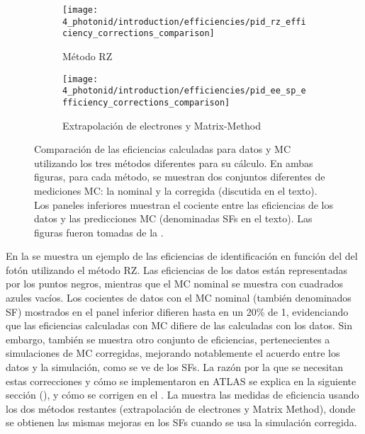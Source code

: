 \begin{figure}[ht!]
    \centering
    \begin{subfigure}[h]{0.49\linewidth}
        \centering
        \texttt{[image: 4\_photonid/introduction/efficiencies/pid\_rz\_efficiency\_corrections\_comparison]}
        \caption{Método \acf{RZ}}
        \label{fig:pid_ss:pid:efficiencies:efficiencies_old:rz}
    \end{subfigure}
    \hfill
    \begin{subfigure}[h]{0.49\linewidth}
        \centering
        \texttt{[image: 4\_photonid/introduction/efficiencies/pid\_ee\_sp\_efficiency\_corrections\_comparison]}
        \caption{Extrapolación de electrones y Matrix-Method}
        \label{fig:pid_ss:pid:efficiencies:efficiencies_old:ee_sp}
    \end{subfigure}
    \caption{Comparación de las eficiencias calculadas para datos y \ac{MC} utilizando los tres métodos diferentes para su cálculo. En ambas figuras, para cada método, se muestran dos conjuntos diferentes de mediciones \ac{MC}: la nominal y la corregida (discutida en el texto). Los paneles inferiores muestran el cociente entre las eficiencias de los datos y las predicciones \ac{MC} (denominadas \acfp{SF} en el texto). Las figuras fueron tomadas de la .}
    \label{fig:pid_ss:pid:efficiencies:efficiencies_old}
\end{figure}


En la \Fig{\ref{fig:pid_ss:pid:efficiencies:efficiencies_old:rz}} se muestra un ejemplo de las eficiencias de identificación en función del \pt del fotón utilizando el método \ac{RZ}. Las eficiencias de los datos están representadas por los puntos negros, mientras que el \ac{MC} nominal se muestra con cuadrados azules vacíos. Los cocientes de datos con el \ac{MC} nominal (también denominados \acf{SF}) mostrados en el panel inferior difieren hasta en un 20\% de 1, evidenciando que las eficiencias calculadas con \ac{MC} difiere de las calculadas con los datos. Sin embargo, también se muestra otro conjunto de eficiencias, pertenecientes a simulaciones de \ac{MC} corregidas, mejorando notablemente el acuerdo entre los datos y la simulación, como se ve de los \acp{SF}. La razón por la que se necesitan estas correcciones y cómo se implementaron en \ac{ATLAS} se explica en la siguiente sección (\Sect{\ref{sec:pid_ss:ss_differences}}), y cómo se corrigen en el \Ch{\ref{ch:ss_corrections}}. La \Fig{\ref{fig:pid_ss:pid:efficiencies:efficiencies_old:ee_sp}} muestra las medidas de eficiencia usando los dos métodos restantes (extrapolación de electrones y Matrix Method), donde se obtienen las mismas mejoras en los \acp{SF} cuando se usa la simulación corregida.

